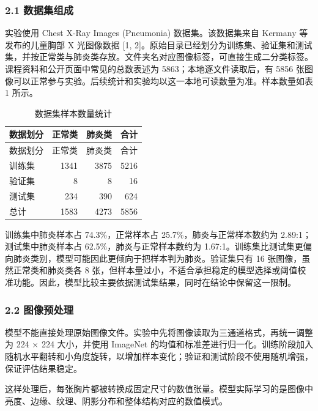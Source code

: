 \documentclass[
]{ctexart}
\begin{document}
\hypertarget{ux6570ux636eux96c6ux7ec4ux6210}{%
\subsubsection{2.1 数据集组成}\label{ux6570ux636eux96c6ux7ec4ux6210}}

实验使用 Chest X-Ray Images (Pneumonia) 数据集。该数据集来自 Kermany
等发布的儿童胸部 X 光图像数据 {[}1,
2{]}。原始目录已经划分为训练集、验证集和测试集，并按正常类与肺炎类存放。文件夹名对应图像标签，可直接生成二分类标签。课程资料和公开页面中常见的总数表述为
5863；本地逐文件读取后，有 5856
张图像可以正常参与实验。后续统计和实验均以这一本地可读数量为准。样本数量如表
1 所示。

\begin{longtable}[]{@{}lrrr@{}}
\caption{数据集样本数量统计}\tabularnewline
\toprule\noalign{}
数据划分 & 正常类 & 肺炎类 & 合计 \\
\midrule\noalign{}
\endfirsthead
\toprule\noalign{}
数据划分 & 正常类 & 肺炎类 & 合计 \\
\midrule\noalign{}
\endhead
\bottomrule\noalign{}
\endlastfoot
训练集 & 1341 & 3875 & 5216 \\
验证集 & 8 & 8 & 16 \\
测试集 & 234 & 390 & 624 \\
总计 & 1583 & 4273 & 5856 \\
\end{longtable}

训练集中肺炎样本占 74.3\%，正常样本占 25.7\%，肺炎与正常样本数约为
2.89:1；测试集中肺炎样本占 62.5\%，肺炎与正常样本数约为
1.67:1。训练集比测试集更偏向肺炎类别，模型可能因此更倾向于把样本判为肺炎。验证集只有
16 张图像，虽然正常类和肺炎类各 8
张，但样本量过小，不适合承担稳定的模型选择或阈值校准功能。因此，模型比较主要依据测试集结果，同时在结论中保留这一限制。

\hypertarget{ux56feux50cfux9884ux5904ux7406}{%
\subsubsection{2.2 图像预处理}\label{ux56feux50cfux9884ux5904ux7406}}

模型不能直接处理原始图像文件。实验中先将图像读取为三通道格式，再统一调整为
224 × 224 大小，并使用 ImageNet
的均值和标准差进行归一化。训练阶段加入随机水平翻转和小角度旋转，以增加样本变化；验证和测试阶段不使用随机增强，保证评估结果稳定。

这样处理后，每张胸片都被转换成固定尺寸的数值张量。模型实际学习的是图像中亮度、边缘、纹理、阴影分布和整体结构对应的数值模式。
\end{document}

